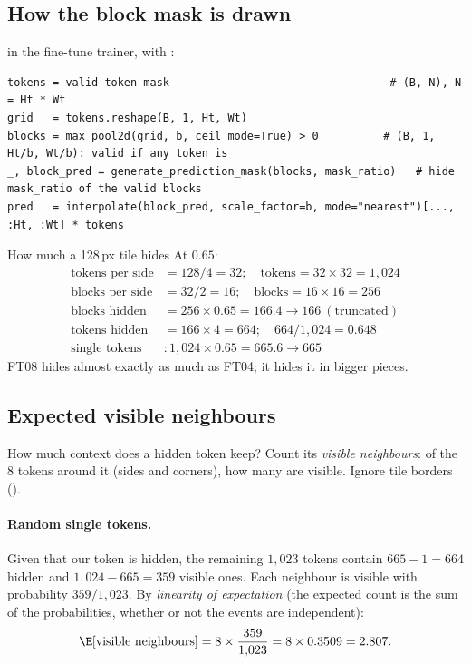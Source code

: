 \subsection{How the block mask is drawn}

 in the fine-tune trainer, with :
\begin{lstlisting}
tokens = valid-token mask                                  # (B, N), N = Ht * Wt
grid   = tokens.reshape(B, 1, Ht, Wt)
blocks = max_pool2d(grid, b, ceil_mode=True) > 0          # (B, 1, Ht/b, Wt/b): valid if any token is
_, block_pred = generate_prediction_mask(blocks, mask_ratio)   # hide mask_ratio of the valid blocks
pred   = interpolate(block_pred, scale_factor=b, mode="nearest")[..., :Ht, :Wt] * tokens
\end{lstlisting}

\begin{worked}[label={we:decoderwork:hidden}]{How much a 128\,px tile hides}
At  $0.65$:
\begin{align*}
\text{tokens per side} &= 128/4 = 32;\quad \text{tokens} = 32\times32 = 1{,}024\\
\text{blocks per side} &= 32/2 = 16;\quad \text{blocks} = 16\times16 = 256\\
\text{blocks hidden} &= 256\times0.65 = 166.4 \to 166 \ (\text{truncated})\\
\text{tokens hidden} &= 166\times4 = 664;\quad 664/1{,}024 = 0.648\\
\text{single tokens} &: 1{,}024\times0.65 = 665.6 \to 665
\end{align*}
FT08 hides almost exactly as much as FT04; it hides it in bigger pieces.
\end{worked}

\subsection{Expected visible neighbours}\label{sec:decoderwork:neighbours}

How much context does a hidden token keep? Count its \emph{visible neighbours}: of the 8 tokens around it
(sides and corners), how many are visible. Ignore tile borders (\tagA).

\paragraph{Random single tokens.} Given that our token is hidden, the remaining $1{,}023$ tokens contain
$665-1=664$ hidden and $1{,}024-665=359$ visible ones. Each neighbour is visible with probability
$359/1{,}023$. By \emph{linearity of expectation} (the expected count is the sum
of the probabilities, whether or not the events are independent):
\begin{equation}\label{eq:decoderwork:single}
\E[\text{visible neighbours}] = 8\times\frac{359}{1{,}023} = 8\times0.3509 = 2.807.
\end{equation}

